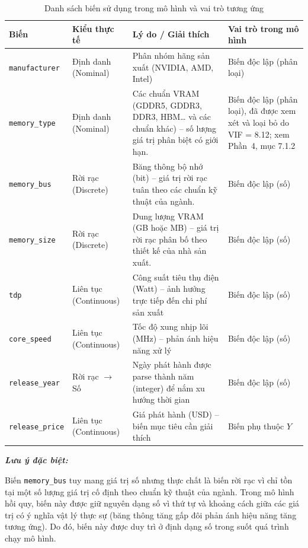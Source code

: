 \documentclass[12pt,a4paper]{article}
\begin{document}
\begin{table}[ht]
\centering
\caption{Danh sách biến sử dụng trong mô hình và vai trò tương ứng}
\label{tab:bien}
\renewcommand{\arraystretch}{1.3}
\begin{tabular}{L{2.4cm} L{2.8cm} L{5.2cm} L{3.6cm}}
\toprule
\textbf{Biến} & \textbf{Kiểu thực tế} & \textbf{Lý do / Giải thích} & \textbf{Vai trò trong mô hình} \\
\midrule
\texttt{manufacturer}  & Định danh (Nominal)  
  & Phân nhóm hãng sản xuất (NVIDIA, AMD, Intel)  
  & Biến độc lập (phân loại) \\

\texttt{memory\_type}  & Định danh (Nominal)  
  & Các chuẩn VRAM (GDDR5, GDDR3, DDR3, HBM\ldots{} và các chuẩn khác) -- số lượng giá trị
    phân biệt có giới hạn.  
  & Biến độc lập (phân loại), đã được xem xét và loại bỏ do VIF = 8.12; xem Phần~4, mục 7.1.2 \\

\texttt{memory\_bus}   & Rời rạc (Discrete)   
  & Băng thông bộ nhớ (bit) -- giá trị rời rạc tuân theo các chuẩn kỹ thuật của ngành.  
  & Biến độc lập (số) \\

\texttt{memory\_size}  & Rời rạc (Discrete)   
  & Dung lượng VRAM (GB hoặc MB) -- giá trị rời rạc phân bố theo thiết kế của nhà sản xuất.  
  & Biến độc lập (số) \\

\texttt{tdp}           & Liên tục (Continuous)
  & Công suất tiêu thụ điện (Watt) -- ảnh hưởng trực tiếp đến chi phí sản xuất  
  & Biến độc lập (số) \\

\texttt{core\_speed}   & Liên tục (Continuous)
  & Tốc độ xung nhịp lõi (MHz) -- phản ánh hiệu năng xử lý  
  & Biến độc lập (số) \\

\texttt{release\_year} & Rời rạc $\to$ Số     
  & Ngày phát hành được parse thành năm (integer) để nắm xu hướng thời gian  
  & Biến độc lập (số) \\

\texttt{release\_price}& Liên tục (Continuous)
  & Giá phát hành (USD) -- biến mục tiêu cần giải thích  
  & Biến phụ thuộc $Y$ \\
\bottomrule
\end{tabular}
\end{table}

\textbf{\textit{Lưu ý đặc biệt:}}

Biến \texttt{memory\_bus} tuy mang giá trị số nhưng thực chất là biến rời rạc vì chỉ
tồn tại một số lượng giá trị cố định theo chuẩn kỹ thuật của ngành. Trong mô hình hồi
quy, biến này được giữ nguyên dạng số vì thứ tự và khoảng cách giữa các giá trị có ý
nghĩa vật lý thực sự (băng thông tăng gấp đôi phản ánh hiệu năng tăng tương ứng). Do
đó, biến này được duy trì ở định dạng số trong suốt quá trình chạy mô hình.
\end{document}

